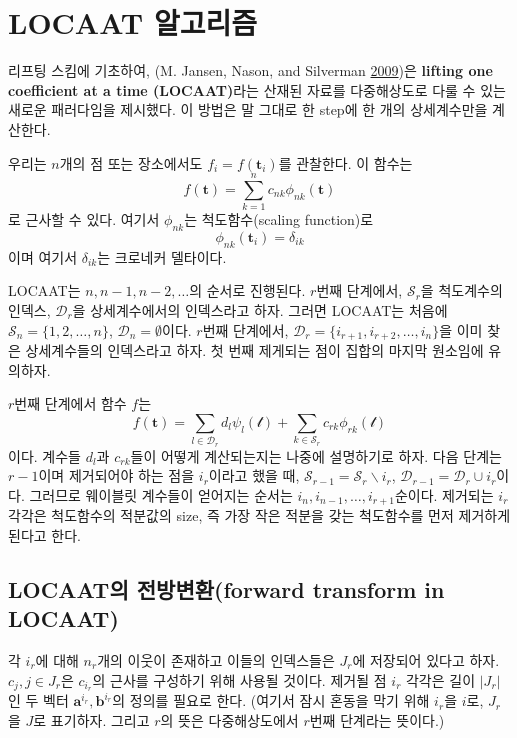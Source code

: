 \documentclass[b5paper,]{book}
\theoremstyle{definition}
\theoremstyle{definition}
\theoremstyle{definition}
\theoremstyle{remark}
\begin{document}
\section{LOCAAT 알고리즘}\label{locaat-}

리프팅 스킴에 기초하여, (M. Jansen, Nason, and Silverman
\protect\hyperlink{ref-Jansen2008}{2009})은 \textbf{lifting one
coefficient at a time (LOCAAT)}라는 산재된 자료를 다중해상도로 다룰 수
있는 새로운 패러다임을 제시했다. 이 방법은 말 그대로 한 step에 한 개의
상세계수만을 계산한다.

우리는 \(n\)개의 점 또는 장소에서도 \(f_{i}=f(\mathbf{t}_{i})\)를
관찰한다. 이 함수는
\[f(\mathbf{t})=\sum_{k=1}^{n}c_{nk}\phi_{nk}(\mathbf{t})\] 로 근사할 수
있다. 여기서 \(\phi_{nk}\)는 척도함수(scaling function)로
\[\phi_{nk}(\mathbf{t}_{i})=\delta_{ik}\] 이며 여기서 \(\delta_{ik}\)는
크로네커 델타이다.

LOCAAT는 \(n, n-1, n-2, \ldots\)의 순서로 진행된다. \(r\)번째 단계에서,
\(\mathcal{S}_{r}\)을 척도계수의 인덱스, \(\mathcal{D}_{r}\)을
상세계수에서의 인덱스라고 하자. 그러면 LOCAAT는 처음에
\(\mathcal{S}_{n}=\{ 1,2,\ldots, n\}\),
\(\mathcal{D}_{n}=\emptyset\)이다. \(r\)번째 단계에서,
\(\mathcal{D}_{r}=\{ i_{r+1}, i_{r+2}, \ldots, i_{n}\}\)을 이미 찾은
상세계수들의 인덱스라고 하자. 첫 번째 제게되는 점이 집합의 마지막
원소임에 유의하자.

\(r\)번째 단계에서 함수 \(f\)는
\[f(\mathbf{t})=\sum_{l\in\mathcal{D}_{r}}d_{l}\psi_{l}(\mathcal{t})+\sum_{k\in\mathcal{S}_{r}}c_{rk}\phi_{rk}(\mathcal{t})\]
이다. 계수들 \(d_{l}\)과 \(c_{rk}\)들이 어떻게 계산되는지는 나중에
설명하기로 하자. 다음 단계는 \(r-1\)이며 제거되어야 하는 점을
\(i_{r}\)이라고 했을 때,
\(\mathcal{S}_{r-1}=\mathcal{S}_{r}\backslash i_{r}\),
\(\mathcal{D}_{r-1}=\mathcal{D}_{r}\cup i_{r}\)이다. 그러므로 웨이블릿
계수들이 얻어지는 순서는 \(i_{n},i_{n-1},\ldots, i_{r+1}\)순이다.
제거되는 \(i_{r}\) 각각은 척도함수의 적분값의 size, 즉 가장 작은 적분을
갖는 척도함수를 먼저 제거하게 된다고 한다.

\subsection{LOCAAT의 전방변환(forward transform in
LOCAAT)}\label{locaat-forward-transform-in-locaat}

각 \(i_{r}\)에 대해 \(n_{r}\)개의 이웃이 존재하고 이들의 인덱스들은
\(J_{r}\)에 저장되어 있다고 하자. \(c_{j}, j\in J_{r}\)은
\(c_{i_{r}}\)의 근사를 구성하기 위해 사용될 것이다. 제거될 점 \(i_{r}\)
각각은 길이 \(|J_{r}|\)인 두 벡터
\(\mathbf{a}^{i_{r}}, \mathbf{b}^{i_{r}}\)의 정의를 필요로 한다. (여기서
잠시 혼동을 막기 위해 \(i_{r}\)을 \(i\)로, \(J_{r}\)을 \(J\)로 표기하자.
그리고 \(r\)의 뜻은 다중해상도에서 \(r\)번째 단계라는 뜻이다.)
\end{document}
